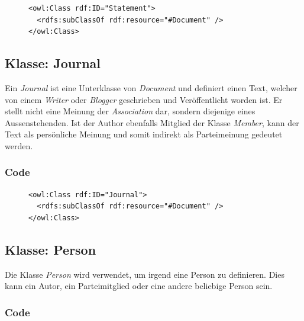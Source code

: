 \documentclass[
    11pt,
    latin1,
    a4paper,
    oneside
]{scrreprt}
\begin{document}
\begin{figure}[H]
 \lstset{language=XML}
 \begin{lstlisting}[label=owl:statement,caption={Ein \emph{Statement} beschreibt eine Aussage einer Person}]
<owl:Class rdf:ID="Statement">
  <rdfs:subClassOf rdf:resource="#Document" />
</owl:Class>
 \end{lstlisting}
\end{figure}

\subsection{Klasse: Journal} \label{sec:class_journal}

Ein \emph{Journal} ist eine Unterklasse von \emph{Document} und definiert einen Text, welcher von einem \emph{Writer} oder \emph{Blogger} geschrieben und Ver\"offentlicht worden ist. Er stellt nicht eine Meinung der \emph{Association} dar, sondern diejenige eines Aussenstehenden. Ist der Author ebenfalls Mitglied der Klasse \emph{Member}, kann der Text als pers\"onliche Meinung und somit indirekt als Parteimeinung gedeutet werden.

\subsubsection{Code} \label{sec:class_journal_code}

\begin{figure}[H]
 \lstset{language=XML}
 \begin{lstlisting}[label=owl:journal,caption={Ein \emph{Journal} ist ein Bericht \"uber eine \emph{Association}, welcher von einer \emph{Organization} herausgegeben wurde}]
<owl:Class rdf:ID="Journal">
  <rdfs:subClassOf rdf:resource="#Document" />
</owl:Class>
 \end{lstlisting}
\end{figure}

\subsection{Klasse: Person} \label{sec:class_person}

Die Klasse \emph{Person} wird verwendet, um irgend eine Person zu definieren. Dies kann ein Autor, ein Parteimitglied oder eine andere beliebige Person sein.

\subsubsection{Code} \label{sec:class_person_code}
\end{document}

